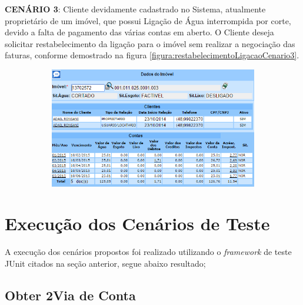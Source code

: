 \begin{flushleft}
	\begin{description}
		\item \textbf{CENÁRIO 3}: Cliente devidamente cadastrado no Sistema, atualmente proprietário de um imóvel, que possui Ligação de Água interrompida por corte, devido a falta de pagamento das várias contas em aberto. O Cliente deseja solicitar restabelecimento da ligação para o imóvel sem realizar a negociação das faturas, conforme demostrado na figura \ref{figura:restabelecimentoLigacaoCenario3}.
		\begin{figure}[H]
			\centering
			\caption{\textbf{Restabelecimento da Ligação de Água - Cenário de Teste 3}}
			\label{figura:restabelecimentoLigacaoCenario3}
			\begin{subfigure}[H]{\textwidth}
				\centering
				\includegraphics{figuras/cenarios/restabelecimento/cenario_3.PNG}
			\end{subfigure}
		\end{figure}
	\end{description}

\end{flushleft}	


\section{\textbf{Execução dos Cenários de Teste}}


A execução dos cenários propostos foi realizado utilizando o \textit{framework} de teste JUnit citados na seção anterior, segue abaixo resultado; 

\subsection{\textbf{Obter 2\textordfeminine  \space Via de Conta}}
 
